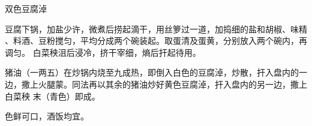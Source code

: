 \begin{recipe}[鸳鸯豆腐淖]{双色豆腐淖}

\ingredients


\preparation

\step 豆腐下锅，加盐少许，微煮后捞起滴干，用丝箩过一道，加捣细的盐和胡椒、味精
、料酒、豆粉搅匀，平均分成两个碗装起。取蛋清及蛋黄，分别放入两个碗内，再调匀。
白菜秧沮后浸冷，挤干宰细，熵后扞起待用。

\step 猪油（一两五）在炒锅内烧至九成热，即倒入白色的豆腐淖，炒散，扞入盘内的一
边，撒上火腿蒙。同法再以其余的猪油炒好黄色豆腐淖，扞入盘内的另一边，撒上白菜秧
末（青色）即成。

\features

色鲜可口，酒饭均宜。

\end{recipe}

